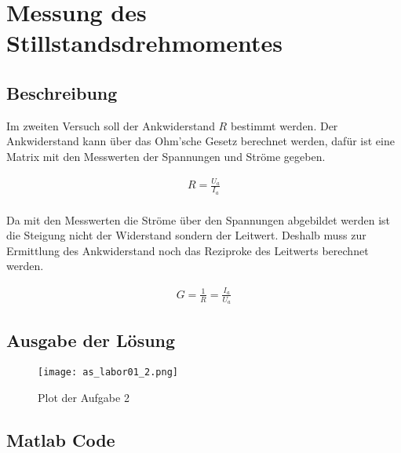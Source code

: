 \section{Messung des Stillstandsdrehmomentes}

\subsection{Beschreibung}

Im zweiten Versuch soll der Ankwiderstand $R$ bestimmt werden.
Der Ankwiderstand kann über das Ohm'sche Gesetz berechnet werden,
dafür ist eine Matrix mit den Messwerten der Spannungen und Ströme gegeben.

\begin{equation} \label{eq2}
    \begin{split}
        R=\frac{U_a}{I_a}\\
    \end{split}
\end{equation}

Da mit den Messwerten die Ströme über den Spannungen abgebildet werden ist die
Steigung nicht der Widerstand sondern der Leitwert. Deshalb muss zur Ermittlung
des Ankwiderstand noch das Reziproke des Leitwerts berechnet werden.

\begin{equation} \label{eq2}
    \begin{split}
        G=\frac{1}{R}=\frac{I_a}{U_a}
    \end{split}
\end{equation}



\subsection{Ausgabe der Lösung}
\begin{figure}[htp]
 \centering
 \texttt{[image: as\_labor01\_2.png]}
 \caption{Plot der Aufgabe 2}
 \label{fig:PlotAufgabe2}
\end{figure}

\subsection{Matlab Code}

